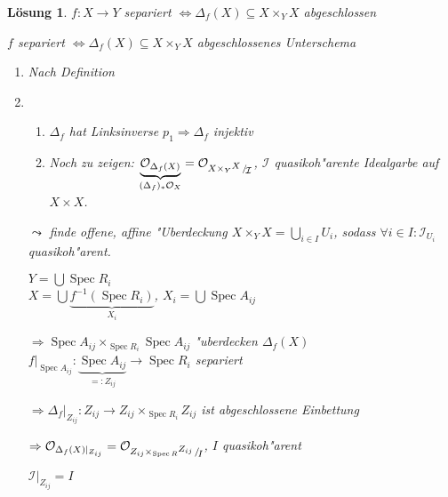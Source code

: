 \documentclass[paper = A4, fontsize=12pt, numbers=noendperiod, chapterprefix=true]{scrbook}
\theoremstyle{break}
\newtheorem{Loes}{L\"osung}
\theoremstyle{nonumberbreak}
\theoremstyle{nonumberplain}
\newcommand{\quot}[1]{\textrm{\glqq}{#1}\textrm{\grqq}}
\newcommand{\Bigcup}{\bigcup\limits}
\newenvironment{twosidedproof}{\begin{enumerate}[\quot{$\Rightarrow$}:]}{\end{enumerate}}
\newcommand{\proofforward}{\item[\quot{$\Rightarrow$}:]}
\newcommand{\proofreverse}{\item[\quot{$\Leftarrow$}:]}
\DeclareMathOperator{\Spec}{Spec}
\DeclareMathOperator{\id}{id}
\newcommand{\calI}{\mathcal{I}}
\newcommand{\calO}{\mathcal{O}}
\newcommand{\X}{\times}
\newcommand{\smallFakRaum}[2]{
	\scriptsize{\raisebox{0.7ex}{\ensuremath{#1}}
	\ensuremath{\mkern-3mu}\ / \ensuremath{\mkern-3mu}
	\raisebox{-0.6ex}{\ensuremath{#2}}}}
\begin{document}
\begin{Loes}
$f: X \to Y$ separiert $\Leftrightarrow \Delta_f(X) \subseteq X \X_Y X$ abgeschlossen
\begin{center}
\begin{minipage}{7cm}\begin{flushright}$f$ separiert $\Leftrightarrow \Delta_f(X) \subseteq X \X_Y X$ abgeschlossenes Unterschema\end{flushright}\end{minipage}\end{center}

\begin{twosidedproof}
\proofforward
	Nach Definition
\proofreverse
	\begin{enumerate}[$\bullet$]
		\item $\Delta_f$ hat Linksinverse $p_1 \Rightarrow \Delta_f$ injektiv
		\item Noch zu zeigen: $\underbrace{\calO_{\Delta_f(X)}}_{(\Delta_f)_*\calO_X} = \calO_{X \X_Y \smallFakRaum{X}{\calI}}$, $\calI$ quasikoh"arente Idealgarbe auf $X \X X$.
	\end{enumerate}
	$\leadsto$ finde offene, affine "Uberdeckung $X \X_Y X = \Bigcup_{i\in I} U_i$, sodass $\forall i \in I: \calI_{U_i}$ quasikoh"arent.
	
	$Y = \bigcup \Spec R_i$\\
	$X = \bigcup \underbrace{f^{-1}(\Spec R_i)}_{X_i}$, $X_i = \bigcup \Spec A_{ij}$
	
	$\Rightarrow \Spec A_{ij} \X_{\Spec R_i} \Spec A_{ij}$ "uberdecken $\Delta_f(X)$\\
	$f|_{\Spec A_{ij}}: \underbrace{\Spec A_{ij}}_{=: Z_{ij}} \to \Spec R_i$ separiert
	
	$\Rightarrow \Delta_f|_{Z_{ij}}: Z_{ij} \to Z_{ij} \X_{\Spec R_i} Z_{ij}$ ist abgeschlossene Einbettung
	
	$\Rightarrow \calO_{\Delta_f(X)|_{Z_{ij}}} = \calO_{Z_{ij} \X_{\Spec R} \smallFakRaum{Z_{ij}}{I}}$, $I$ quasikoh"arent
	
	$\calI|_{Z_{ij}} = I$
\end{twosidedproof}\end{Loes}
\end{document}
